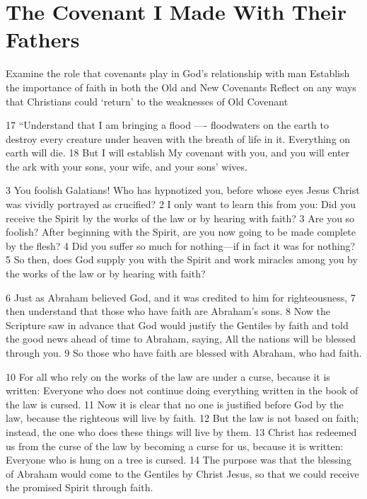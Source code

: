 \chapter{The Covenant I Made With Their Fathers}

\begin{goals}
\goal Examine the role that covenants play in God's relationship with man
\goal Establish the importance of faith in both the Old and New Covenants
\goal Reflect on any ways that Christians could `return' to the weaknesses of Old Covenant
\end{goals}

\begin{bible}


17 ``Understand that I am bringing a flood —- floodwaters on the earth to destroy every creature under heaven with the breath of life in it. Everything on earth will die.  18 But I will establish My covenant with you, and you will enter the ark with your sons, your wife, and your sons' wives. 

3 You foolish Galatians! Who has hypnotized you, before whose eyes Jesus Christ was vividly portrayed as crucified?  2 I only want to learn this from you: Did you receive the Spirit by the works of the law or by hearing with faith?  3 Are you so foolish? After beginning with the Spirit, are you now going to be made complete by the flesh?  4 Did you suffer so much for nothing—if in fact it was for nothing?  5 So then, does God supply you with the Spirit and work miracles among you by the works of the law or by hearing with faith?

6 Just as Abraham believed God, and it was credited to him for righteousness,  7 then understand that those who have faith are Abraham's sons.  8 Now the Scripture saw in advance that God would justify the Gentiles by faith and told the good news ahead of time to Abraham, saying, All the nations will be blessed through you.  9 So those who have faith are blessed with Abraham, who had faith.

10 For all who rely on the works of the law are under a curse, because it is written: Everyone who does not continue doing everything written in the book of the law is cursed.  11 Now it is clear that no one is justified before God by the law, because the righteous will live by faith.  12 But the law is not based on faith; instead, the one who does these things will live by them.  13 Christ has redeemed us from the curse of the law by becoming a curse for us, because it is written: Everyone who is hung on a tree is cursed.  14 The purpose was that the blessing of Abraham would come to the Gentiles by Christ Jesus, so that we could receive the promised Spirit through faith.


\end{bible}
